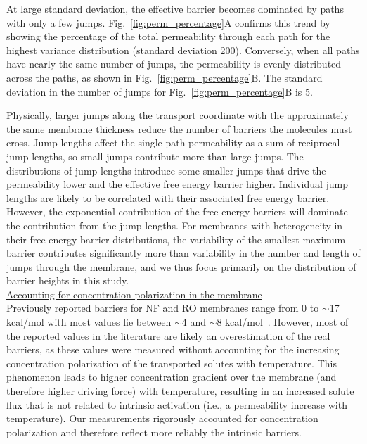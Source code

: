At large standard deviation, the effective barrier becomes dominated by paths with only a few jumps. Fig.~\ref{fig:perm_percentage}A confirms this trend by showing the percentage of the total permeability through each path for the highest variance distribution (standard deviation 200). Conversely, when all paths have nearly the same number of jumps, the permeability is evenly distributed across the paths, as shown in Fig.~\ref{fig:perm_percentage}B. The standard deviation in the number of jumps for Fig.~\ref{fig:perm_percentage}B is 5. 

Physically, larger jumps along the transport coordinate with the approximately the same membrane thickness reduce the number of barriers the molecules must cross. Jump lengths affect the single path permeability as a sum of reciprocal jump lengths, so small jumps contribute more than large jumps. The distributions of jump lengths introduce some smaller jumps that drive the permeability lower and the effective free energy barrier higher. Individual jump lengths are likely to be correlated with their associated free energy barrier. However, the exponential contribution of the free energy barriers will dominate the contribution from the jump lengths. For membranes with heterogeneity in their free energy barrier distributions, the variability of the smallest maximum barrier contributes significantly more than variability in the number and length of jumps through the membrane, and we thus focus primarily on the distribution of barrier heights in this study. \\

\noindent \underline{Accounting for concentration polarization in the membrane} \\
Previously reported barriers for NF and RO membranes range from 0 to $\sim$17 kcal/mol with most values lie between $\sim$4 and $\sim$8 kcal/mol~\cite{epsztein_towards_2020}. However, most of the reported values in the literature are likely an overestimation of the real barriers, as these values were measured without accounting for the increasing concentration polarization of the transported solutes with temperature. This phenomenon leads to higher concentration gradient over the membrane (and therefore higher driving force) with temperature, resulting in an increased solute flux that is not related to intrinsic activation (i.e., a permeability increase with temperature). Our measurements rigorously accounted for concentration polarization and therefore reflect more reliably the intrinsic barriers. 

